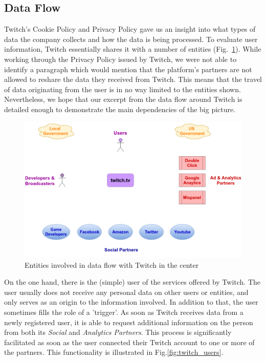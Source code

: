 \subsection{Data Flow}
Twitch's Cookie Policy and Privacy Policy gave us an insight into what types of data the company collects and how the data is being processed. To evaluate user information, Twitch essentially shares it with a number of entities (Fig.~\ref{fig:twitch_entities}). While working through the Privacy Policy issued by Twitch, we were not able to identify a paragraph which would mention that the platform's partners are not allowed to reshare the data they received from Twitch. This means that the travel of data originating from the user is in no way limited to the entities shown. Nevertheless, we hope that our excerpt from the data flow around Twitch is detailed enough to demonstrate the main dependencies of the big picture. 

\begin{figure}[h!]
	\centering
	\includegraphics[width=0.9\linewidth]{sections/figures/twitch_entities}
	\caption{Entities involved in data flow with Twitch in the center}
	\label{fig:twitch_entities}
\end{figure}

On the one hand, there is the (simple) user of the services offered by Twitch. The user usually does not receive any personal data on other users or entities, and only serves as an origin to the information involved. In addition to that, the user sometimes fills the role of a 'trigger'. As soon as Twitch receives data from a newly registered user, it is able to request additional information on the person from both its \textit{Social} and \textit{Analytics Partners}. This process is significantly facilitated as soon as the user connected their Twitch account to one or more of the partners. This functionality is illustrated in Fig.\ref{fig:twitch_users}. 

